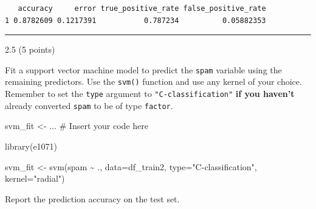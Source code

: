 \documentclass[
  letterpaper,
  DIV=11,
  numbers=noendperiod]{scrartcl}
\newenvironment{Shaded}{\begin{snugshade}}{\end{snugshade}}
\newcommand{\AttributeTok}[1]{\textcolor[rgb]{0.40,0.45,0.13}{#1}}
\newcommand{\CommentTok}[1]{\textcolor[rgb]{0.37,0.37,0.37}{#1}}
\newcommand{\FunctionTok}[1]{\textcolor[rgb]{0.28,0.35,0.67}{#1}}
\newcommand{\NormalTok}[1]{\textcolor[rgb]{0.00,0.23,0.31}{#1}}
\newcommand{\OtherTok}[1]{\textcolor[rgb]{0.00,0.23,0.31}{#1}}
\newcommand{\SpecialCharTok}[1]{\textcolor[rgb]{0.37,0.37,0.37}{#1}}
\newcommand{\StringTok}[1]{\textcolor[rgb]{0.13,0.47,0.30}{#1}}
\begin{document}
\begin{Shaded}
\end{Shaded}

\begin{verbatim}
   accuracy     error true_positive_rate false_positive_rate
1 0.8782609 0.1217391           0.787234          0.05882353
\end{verbatim}

\begin{center}\rule{0.5\linewidth}{0.5pt}\end{center}

2.5 (5 points)

Fit a support vector machine model to predict the \texttt{spam} variable
using the remaining predictors. Use the \texttt{svm()} function and use
any kernel of your choice. Remember to set the \texttt{type} argument to
\texttt{"C-classification"} \textbf{if you haven't} already converted
\texttt{spam} to be of type \texttt{factor}.

\begin{Shaded}
\begin{Highlighting}[]
\NormalTok{svm\_fit }\OtherTok{\textless{}{-}}\NormalTok{ ... }\CommentTok{\# Insert your code here}
\end{Highlighting}
\end{Shaded}

\begin{Shaded}
\begin{Highlighting}[]
\FunctionTok{library}\NormalTok{(e1071)}

\NormalTok{svm\_fit }\OtherTok{\textless{}{-}} \FunctionTok{svm}\NormalTok{(spam }\SpecialCharTok{\textasciitilde{}}\NormalTok{ ., }\AttributeTok{data=}\NormalTok{df\_train2, }\AttributeTok{type=}\StringTok{"C{-}classification"}\NormalTok{, }\AttributeTok{kernel=}\StringTok{"radial"}\NormalTok{)}
\end{Highlighting}
\end{Shaded}

Report the prediction accuracy on the test set.
\end{document}
